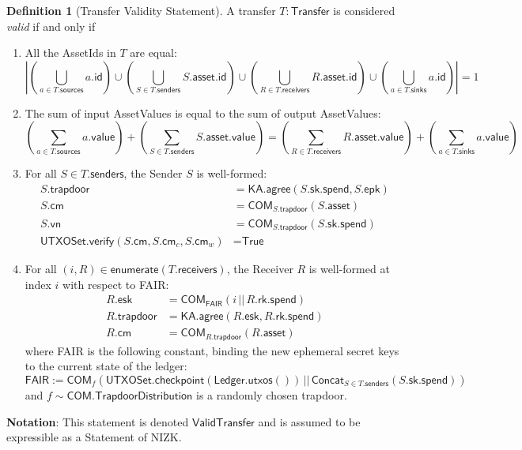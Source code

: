 \documentclass[a4paper]{article}
\theoremstyle{definition}
\newtheorem{definition}{Definition}[subsection]
\renewcommand{\abs}[1]{\left|#1\right|}
\newcommand{\AssetId}{{\textsf{AssetId}}}
\newcommand{\AssetValue}{{\textsf{AssetValue}}}
\newcommand{\COM}{{\textsf{COM}}}
\newcommand{\Concat}{{\textsf{Concat}}}
\newcommand{\Enumerate}{{\textsf{enumerate}}}
\newcommand{\FAIR}{{\textsf{FAIR}}}
\newcommand{\ID}{{\textsf{id}}}
\newcommand{\KA}{{\textsf{KA}}}
\newcommand{\Ledger}{{\textsf{Ledger}}}
\newcommand{\NIZK}{{\textsf{NIZK}}}
\newcommand{\Receiver}{{\textsf{Receiver}}}
\newcommand{\Sender}{{\textsf{Sender}}}
\newcommand{\Statement}{{\textsf{Statement}}}
\newcommand{\Transfer}{{\textsf{Transfer}}}
\newcommand{\TrapdoorDistribution}{{\textsf{TrapdoorDistribution}}}
\newcommand{\True}{{\textsf{True}}}
\newcommand{\UTXOSet}{{\textsf{UTXOSet}}}
\newcommand{\VALUE}{{\textsf{value}}}
\newcommand{\ValidTransfer}{{\textsf{ValidTransfer}}}
\newcommand{\agree}{{\textsf{agree}}}
\newcommand{\asset}{{\textsf{asset}}}
\newcommand{\checkpoint}{{\textsf{checkpoint}}}
\newcommand{\cm}{{\textsf{cm}}}
\newcommand{\epk}{{\textsf{epk}}}
\newcommand{\esk}{{\textsf{esk}}}
\newcommand{\receivers}{{\textsf{receivers}}}
\newcommand{\rk}{{\textsf{rk}}}
\newcommand{\senders}{{\textsf{senders}}}
\newcommand{\sinks}{{\textsf{sinks}}}
\newcommand{\sk}{{\textsf{sk}}}
\newcommand{\sources}{{\textsf{sources}}}
\newcommand{\spend}{{\textsf{spend}}}
\newcommand{\trapdoor}{{\textsf{trapdoor}}}
\newcommand{\utxos}{{\textsf{utxos}}}
\newcommand{\verify}{{\textsf{verify}}}
\newcommand{\vn}{{\textsf{vn}}}
\begin{document}
\begin{definition}[\Transfer{} Validity \Statement{}]\label{def:transfer-validity-statement}
    A transfer $T : \Transfer$ is considered \emph{valid} if and only if
    \begin{enumerate}
        \item All the \AssetId{s} in $T$ are equal:
            \[
                \abs{
                    \left(\bigcup_{a \in T.\sources} a.\ID \right)
                    \cup
                    \left(\bigcup_{S \in T.\senders} S.\asset.\ID \right)
                    \cup
                    \left(\bigcup_{R \in T.\receivers} R.\asset.\ID \right)
                    \cup
                    \left(\bigcup_{a \in T.\sinks} a.\ID \right)
                } = 1
            \]
        \item The sum of input \AssetValue{s} is equal to the sum of output \AssetValue{s}:
            \[
                \left(\sum_{a \in T.\sources} a.\VALUE\right)
                +
                \left(\sum_{S \in T.\senders} S.\asset.\VALUE\right)
                =
                \left(\sum_{R \in T.\receivers} R.\asset.\VALUE\right)
                +
                \left(\sum_{a \in T.\sinks} a.\VALUE\right)
            \]
        \item For all $S \in T.\senders$, the \Sender{} $S$ is well-formed:
            \begin{align*}
                S.\trapdoor                               &= \KA.\agree(S.\sk.\spend, S.\epk) \\
                S.\cm                                     &= \COM_{S.\trapdoor}(S.\asset) \\
                S.\vn                                     &= \COM_{S.\trapdoor}(S.\sk.\spend) \\
                \UTXOSet.\verify(S.\cm, S.\cm_c, S.\cm_w) &= \True
            \end{align*}
        \item For all $(i, R) \in \Enumerate(T.\receivers)$, the \Receiver{} $R$ is well-formed at index $i$ with respect to \FAIR{}:
            \begin{align*}
                R.\esk      &= \COM_{\FAIR}(i \,||\, R.\rk.\spend) \\
                R.\trapdoor &= \KA.\agree(R.\esk, R.\rk.\spend) \\
                R.\cm       &= \COM_{R.\trapdoor}(R.\asset)
            \end{align*}
            where \FAIR{} is the following constant, binding the new ephemeral secret keys to the current state of the ledger:
            \[\FAIR := \COM_f(\UTXOSet.\checkpoint(\Ledger.\utxos()) \,||\, \Concat_{S \in T.\senders}(S.\sk.\spend))\]
            and $f \sim \COM.\TrapdoorDistribution$ is a randomly chosen trapdoor.
    \end{enumerate}
    \textbf{Notation}: This statement is denoted $\ValidTransfer$ and is assumed to be expressible as a \Statement{} of \NIZK{}.
\end{definition}
\end{document}
